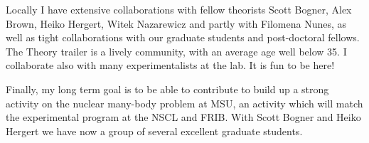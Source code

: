\documentclass[prc,amsart,english,twocolumn,superscriptaddress,showpacs,floatfix]{revtex4}
\begin{document}
Locally I have extensive collaborations with fellow theorists Scott Bogner, Alex Brown, Heiko Hergert, Witek Nazarewicz and partly with Filomena Nunes, as well as tight collaborations with our graduate students and post-doctoral fellows. The Theory trailer is a lively community, with an average age well below 35. I collaborate also 
with many experimentalists at the lab. It is fun to be here!

Finally, my long term goal is to be able to contribute to build up a
strong activity on the nuclear many-body problem at MSU, an activity
which will match the experimental program at the NSCL and FRIB. With
Scott Bogner and Heiko Hergert we have now a group of several excellent graduate students. 


 
\end{document}
